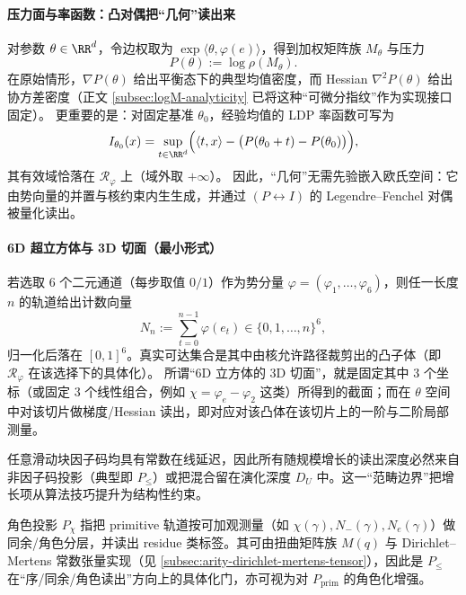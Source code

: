 \paragraph{压力面与率函数：凸对偶把“几何”读出来}
对参数 \(\theta\in\RR^d\)，令边权取为 \(\exp\langle\theta,\varphi(e)\rangle\)，得到加权矩阵族 \(M_\theta\) 与压力
$$
P(\theta):=\log\rho(M_\theta).
$$
在原始情形，\(\nabla P(\theta)\) 给出平衡态下的典型均值密度，而 Hessian \(\nabla^2P(\theta)\) 给出协方差密度（正文 \ref{subsec:logM-analyticity} 已将这种“可微分指纹”作为实现接口固定）。
更重要的是：对固定基准 \(\theta_0\)，经验均值的 LDP 率函数可写为
$$
I_{\theta_0}(x)=\sup_{t\in\RR^d}\Bigl(\langle t,x\rangle-\bigl(P(\theta_0+t)-P(\theta_0)\bigr)\Bigr),
$$
其有效域恰落在 \(\mathcal{R}_\varphi\) 上（域外取 \(+\infty\)）。
因此，“几何”无需先验嵌入欧氏空间：它由势向量的并置与核约束内生生成，并通过 \((P\leftrightarrow I)\) 的 Legendre--Fenchel 对偶被量化读出。

\paragraph{6D 超立方体与 3D 切面（最小形式）}
若选取 \(6\) 个二元通道（每步取值 \(0/1\)）作为势分量 \(\varphi=(\varphi_1,\dots,\varphi_6)\)，则任一长度 \(n\) 的轨道给出计数向量
$$
N_n:=\sum_{t=0}^{n-1}\varphi(e_t)\in\{0,1,\dots,n\}^6,
$$
归一化后落在 \([0,1]^6\)。真实可达集合是其中由核允许路径裁剪出的凸子体（即 \(\mathcal{R}_\varphi\) 在该选择下的具体化）。
所谓“6D 立方体的 3D 切面”，就是固定其中 \(3\) 个坐标（或固定 \(3\) 个线性组合，例如 \(\chi=\varphi_e-\varphi_2\) 这类）所得到的截面；而在 \(\theta\) 空间中对该切片做梯度/Hessian 读出，即对应对该凸体在该切片上的一阶与二阶局部测量。

\begin{remark}[范畴边界与不可并行增长]\label{rem:pom-factor-boundary}
任意滑动块因子码均具有常数在线延迟，因此所有随规模增长的读出深度必然来自非因子码投影（典型即 $P_{\le}$）或把混合留在演化深度 $D_U$ 中。这一“范畴边界”把增长项从算法技巧提升为结构性约束。
\end{remark}

\begin{definition}\label{def:pom-proj-chi}
角色投影 $P_\chi$ 指把 primitive 轨道按可加观测量（如 $\chi(\gamma),N_-(\gamma),N_e(\gamma)$）做同余/角色分层，并读出 residue 类标签。其可由扭曲矩阵族 $M(q)$ 与 Dirichlet--Mertens 常数张量实现（见 \ref{subsec:arity-dirichlet-mertens-tensor}），因此是 $P_{\le}$ 在“序/同余/角色读出”方向上的具体化门，亦可视为对 $P_{\mathrm{prim}}$ 的角色化增强。
\end{definition}

